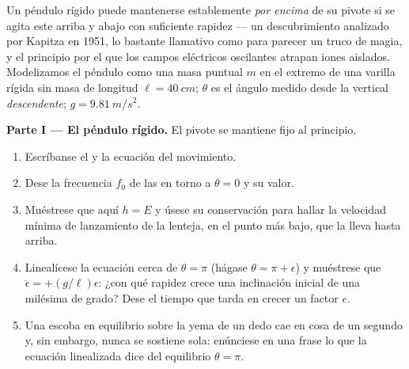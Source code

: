 \begin{problem}\label{pb:b3:lagrangian-mechanics:1}
Un péndulo rígido puede mantenerse establemente \emph{por encima} de su
pivote si se agita este arriba y abajo con suficiente rapidez --- un
descubrimiento analizado por Kapitza en 1951, lo bastante llamativo como
para parecer un truco de magia, y el principio por el que los campos
eléctricos oscilantes atrapan iones aislados. Modelizamos el péndulo como
una masa puntual $m$ en el extremo de una varilla rígida sin masa de
longitud $\ell = \qty{40}{cm}$; $\theta$ es el ángulo medido desde la
vertical \emph{descendente}; $g = \qty{9.81}{m/s^2}$.

\medskip\noindent\textbf{Parte I --- El péndulo rígido.}
El pivote se mantiene fijo al principio.
\begin{enumerate}
  \item Escríbanse el  y la ecuación del movimiento.
  \item Dese la frecuencia $f_0$ de las  en torno a $\theta =
        0$ y su valor.
  \item Muéstrese que aquí $h = E$ y úsese su conservación para hallar la
        velocidad mínima de lanzamiento de la lenteja, en el punto más
        bajo, que la lleva hasta arriba.
  \item Linealícese la ecuación cerca de $\theta = \pi$ (hágase $\theta = \pi +
        \epsilon$) y muéstrese que $\ddot\epsilon = +(g/\ell)\epsilon$: ¿con
        qué rapidez crece una inclinación inicial de una milésima de grado?
        Dese el tiempo que tarda en crecer un factor $e$.
  \item Una escoba en equilibrio sobre la yema de un dedo cae en cosa de un
        segundo y, sin embargo, nunca se sostiene sola: enúnciese en una
        frase lo que la ecuación linealizada dice del equilibrio
        $\theta = \pi$.
\end{enumerate}


\end{problem}
